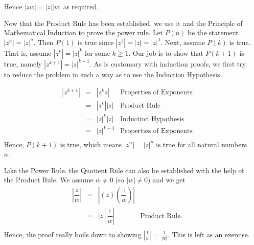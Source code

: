Hence $|zw| = |z| |w|$ as required.  

\smallskip


Now that the Product Rule has been established, we use it and the Principle of Mathematical Induction to 	prove the power rule.  Let $P(n)$ be the statement $\left|z^{n}\right| = |z|^n$.  Then $P(1)$ is true since $\left|z^{1}\right| = |z| = |z|^1$.  Next, assume $P(k)$ is true.  That is, assume $\left|z^{k}\right| = |z|^k$ for some $k \geq 1$.  Our job is to show that $P(k+1)$ is true, namely $\left|z^{k+1}\right| = |z|^{k+1}$.  As is customary with induction proofs, we first try to reduce the problem in such a way as to  use the Induction Hypothesis.

\[\begin{array}{rcll}
\left|z^{k+1}\right| & = & \left|z^{k} z\right| & \text{Properties of Exponents} \\[3pt]
										 & = & \left|z^{k}\right| |z| & \text{Product Rule} \\[3pt]
										 & = &  |z|^{k} |z| & \text{Induction Hypothesis} \\[3pt]
										 & = &  |z|^{k+1} & \text{Properties of Exponents} \\ \end{array} \]
Hence, $P(k+1)$ is true, which means $\left|z^{n}\right| = |z|^{n}$ is true for all natural numbers $n$.  

\smallskip

Like the Power Rule, the Quotient Rule can also be established with the help of the Product Rule. We assume $w \neq 0$ (so $|w| \neq 0$) and we get
\[ \begin{array}{rcll}

\left| \dfrac{z}{w} \right| &  = & \left| (z) \left( \dfrac{1}{w} \right) \right| & \\ [7pt] 
										        & = & |z| \left| \dfrac{1}{w}\right| & \text{Product Rule.} \\ \end{array} \]
Hence, the proof really boils down to showing $\left| \frac{1}{w} \right| = \frac{1}{|w|}$.  This is left as an exercise.

